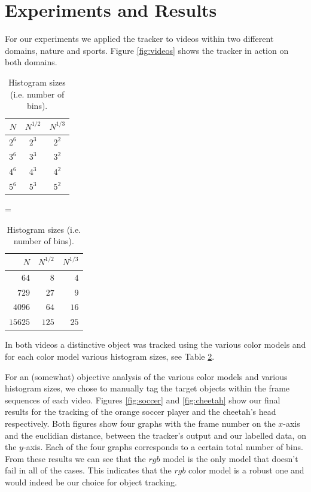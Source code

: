 \documentclass[11pt]{article}
\begin{document}
\section{Experiments and Results} \label{sec:results}
For our experiments we applied the tracker to videos within two different
domains, nature and sports. Figure \ref{fig:videos} shows the tracker in action
on both domains. 
\begin{table}
\centering
\begin{tabular}{c|c|c}
$N$   & $N^{1/2}$ & $N^{1/3}$\\\hline\hline
$2^6$ & $2^3$     & $2^2$\\\hline
$3^6$ & $3^3$     & $3^2$\\\hline
$4^6$ & $4^3$     & $4^2$\\\hline
$5^6$ & $5^3$     & $5^2$\\
\end{tabular}
=
\begin{tabular}{r|r|r}
$N$     & $N^{1/2}$ & $N^{1/3}$\\\hline\hline
$64$    & $8$       & $4$\\\hline
$729$   & $27$      & $9$\\\hline
$4096$  & $64$      & $16$\\\hline
$15625$ & $125$     & $25$\\
\end{tabular}
\caption{Histogram sizes (i.e. number of bins).}
\label{table:bins}
\end{table}
In both videos a distinctive object was tracked using the various color models
and for each color model various histogram sizes, see Table \ref{table:bins}.

For an (somewhat) objective analysis of the various color models and various
histogram sizes, we chose to manually tag the target objects within the frame
sequences of each video. Figures \ref{fig:soccer} and \ref{fig:cheetah} show
our final results for the tracking of the orange soccer player and the
cheetah's head respectively.  Both figures show four graphs with the frame
number on the $x$-axis and the
euclidian distance, between the tracker's output and our labelled data, on the
$y$-axis. Each of the four graphs corresponds to a certain total number of
bins. From these results we can see that the $rgb$ model is the only model that
doesn't fail in all of the cases. This indicates that the $rgb$ color model is a
robust one and would indeed be our choice for object tracking.
\end{document}
